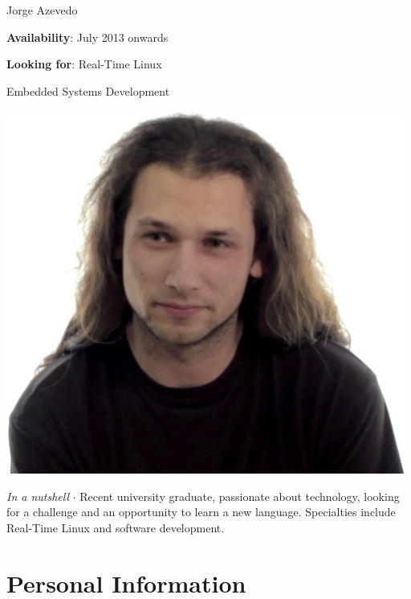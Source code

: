 



\topSection
{
	{\Huge Jorge Azevedo}

	\vspace{1.5mm}
	\vspace*{10mm}

	\textbf{Availability}: July 2013 onwards

	\textbf{Looking for}: Real-Time Linux

	\hspace{66pt}Embedded Systems Development
} {
	\includegraphics[width=0.985\textwidth]{img/photo}
}

\emph{In a nutshell} $\cdot$  Recent university graduate, passionate about
technology, looking for a challenge and an opportunity to learn
a new language.  Specialties include Real-Time Linux and software development.

\section*{Personal Information}


